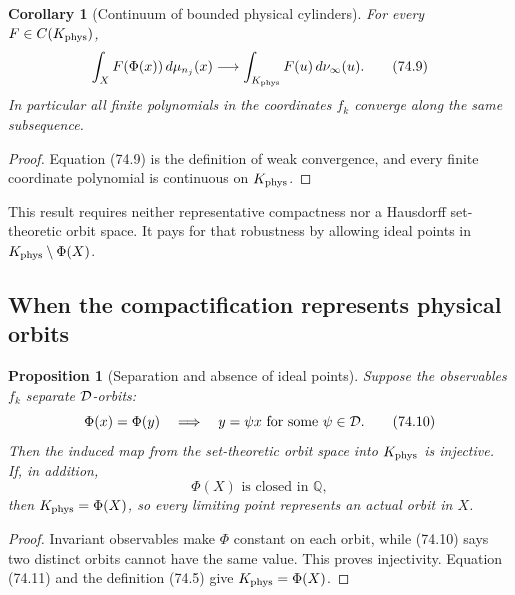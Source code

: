 \documentclass[11pt]{article}
\newtheorem{proposition}[theorem]{Proposition}
\newtheorem{corollary}[theorem]{Corollary}
\theoremstyle{remark}
\begin{document}
\begin{corollary}[Continuum of bounded physical cylinders]
\label{cor:v12v74-cylinders}
For every \(F\in C(K_{\rm phys})\),
\begin{equation}
 \int_X F(\Phi(x))\,d\mu_{n_j}(x)
 \longrightarrow
 \int_{K_{\rm phys}}F(u)\,d\nu_\infty(u).                   \tag{74.9}
\end{equation}
In particular all finite polynomials in the coordinates \(f_k\)
converge along the same subsequence.
\end{corollary}

\begin{proof}
Equation (74.9) is the definition of weak convergence, and every
finite coordinate polynomial is continuous on \(K_{\rm phys}\).
\end{proof}

This result requires neither representative compactness nor a
Hausdorff set-theoretic orbit space.  It pays for that robustness by
allowing ideal points in
\(K_{\rm phys}\setminus\Phi(X)\).

\subsection{When the compactification represents physical orbits}

\begin{proposition}[Separation and absence of ideal points]
\label{prop:v12v74-separation}
Suppose the observables \(f_k\) separate \({\cal D}\)-orbits:
\begin{equation}
 \Phi(x)=\Phi(y)
 \quad\Longrightarrow\quad
 y=\psi x\text{ for some }\psi\in{\cal D}.                  \tag{74.10}
\end{equation}
Then the induced map from the set-theoretic orbit space into
\(K_{\rm phys}\) is injective.  If, in addition,
\begin{equation}
                              \Phi(X)\text{ is closed in }\mathbb Q,
                                                                    \tag{74.11}
\end{equation}
then \(K_{\rm phys}=\Phi(X)\), so every limiting point represents an
actual orbit in \(X\).
\end{proposition}

\begin{proof}
Invariant observables make \(\Phi\) constant on each orbit, while
(74.10) says two distinct orbits cannot have the same value.  This
proves injectivity.  Equation (74.11) and the definition (74.5) give
\(K_{\rm phys}=\Phi(X)\).
\end{proof}
\end{document}
